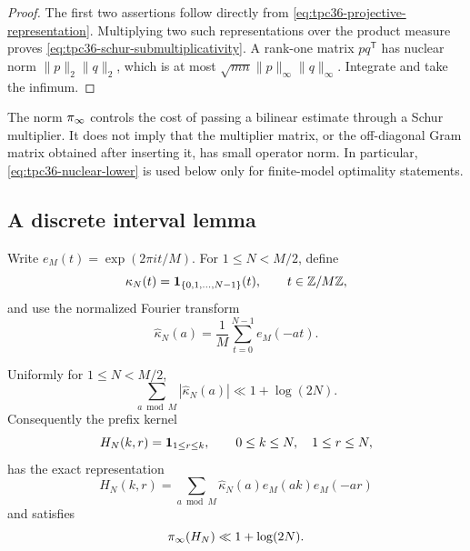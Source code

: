 \begin{proof}
The first two assertions follow directly from
\eqref{eq:tpc36-projective-representation}.  Multiplying two such
representations over the product measure proves
\eqref{eq:tpc36-schur-submultiplicativity}.  A rank-one matrix
\(pq^{\mathsf T}\) has nuclear norm
\(\|p\|_2\|q\|_2\), which is at most
\(\sqrt{mn}\|p\|_\infty\|q\|_\infty\).  Integrate and take the infimum.
\end{proof}

\begin{remark}
The norm \(\pi_{\infty}\) controls the cost of passing a bilinear estimate through
a Schur multiplier.  It does not imply that the multiplier matrix, or the
off-diagonal Gram matrix obtained after inserting it, has small operator
norm.  In particular, \eqref{eq:tpc36-nuclear-lower} is used below only
for finite-model optimality statements.
\end{remark}

\subsection{A discrete interval lemma}

Write \(e_M(t)=\exp(2\pi i t/M)\).  For \(1\le N<M/2\), define
\begin{equation}
 \kappa_N(t)=\mathbf 1_{\{0,1,\ldots,N-1\}}(t),
 \qquad t\in\mathbb Z/M\mathbb Z,
 \label{eq:tpc36-cyclic-interval}
\end{equation}
and use the normalized Fourier transform
\begin{equation}
 \widehat\kappa_N(a)
 =\frac1M\sum_{t=0}^{N-1}e_M(-at).
 \label{eq:tpc36-interval-Fourier}
\end{equation}

\begin{lemma}
\label{lem:tpc36-interval-Fourier}
Uniformly for \(1\le N<M/2\),
\begin{equation}
 \sum_{a\bmod M}|\widehat\kappa_N(a)|
 \ll1+\log(2N).
 \label{eq:tpc36-interval-l1}
\end{equation}
Consequently the prefix kernel
\begin{equation}
 H_N(k,r)=\mathbf 1_{1\le r\le k},
 \qquad 0\le k\le N,\quad 1\le r\le N,
 \label{eq:tpc36-prefix-kernel}
\end{equation}
has the exact representation
\begin{equation}
 H_N(k,r)=\sum_{a\bmod M}
 \widehat\kappa_N(a)e_M(ak)e_M(-ar)
 \label{eq:tpc36-prefix-Fourier}
\end{equation}
and satisfies
\begin{equation}
 \pi_{\infty}(H_N)\ll1+\log(2N).
 \label{eq:tpc36-prefix-projective-upper}
\end{equation}
\end{lemma}

